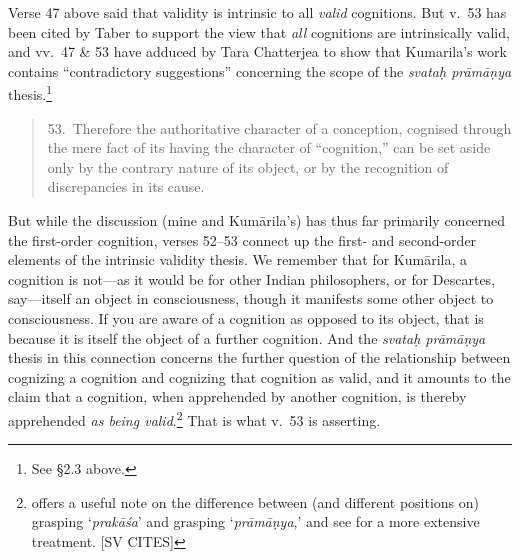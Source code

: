 ﻿\documentclass[11pt]{amsart}
\begin{document}
Verse 47 above said that validity is intrinsic to all \emph{valid} cognitions. But v.~53 has been cited by Taber to support the view that \emph{all} cognitions are intrinsically valid, and vv.~47 \& 53 have adduced by Tara Chatterjea to show that Kumarila's work contains ``contradictory suggestions'' concerning the scope of the \emph{svata\d h pr\=am\=a\d nya} thesis.\footnote{See \S2.3 above.}\small\begin{quote}53.~Therefore the authoritative character of a conception, cognised through the mere fact of its having the character of ``cognition,'' can be set aside only by the contrary nature of its object, or by the recognition of discrepancies in its cause.\end{quote}\normalsize But while the discussion (mine and Kum\=arila's) has thus far primarily concerned the first-order cognition, verses 52--53 connect up the first- and second-order elements of the intrinsic validity thesis. We remember that for Kum\=arila, a cognition is not---as it would be for other Indian philosophers, or for Descartes, say---itself an object in consciousness, though it manifests some other object to consciousness. If you are aware of a cognition as opposed to its object, that is because it is itself the object of a further cognition. And the \emph{svata\d h pr\=am\=a\d nya} thesis in this connection concerns the further question of the relationship between cognizing a cognition and cognizing that cognition as valid, and it amounts to the claim that a cognition, when apprehended by another cognition, is thereby apprehended \emph{as being valid}.\footnote{\citet[p.~3]{mohanty1989gangesa} offers a useful note on the difference between (and different positions on) grasping `\emph{prak\=a\'sa}' and grasping `\emph{pr\=am\=a\d nya},' and see \citet{sen1984concept} for a more extensive treatment. [SV CITES]} That is what v.~53 is asserting.
\end{document}
